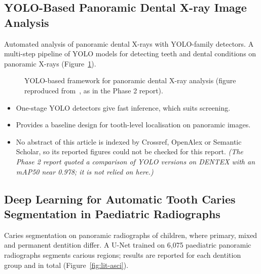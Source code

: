 \subsection{YOLO-Based Panoramic Dental X-ray Image Analysis~\cite{nassiri2025yolo}}
 Automated analysis of panoramic dental X-rays with YOLO-family detectors.
 A multi-step pipeline of YOLO models for detecting teeth and dental conditions
on panoramic X-rays (Figure~\ref{fig:lit-nassiri}).

\begin{figure}[!htbp]
\centering
{}
\caption[YOLO-based framework for panoramic dental X-ray analysis]{YOLO-based framework for panoramic
dental X-ray analysis (figure reproduced from~\cite{nassiri2025yolo}, as in the Phase 2 report).}
\label{fig:lit-nassiri}
\end{figure}

\begin{itemize}
\item One-stage YOLO detectors give fast inference, which suits screening.
\item Provides a baseline design for tooth-level localisation on panoramic images.
\end{itemize}
\begin{itemize}
\item No abstract of this article is indexed by Crossref, OpenAlex or Semantic Scholar, so its
  reported figures could not be checked for this report. \emph{(The Phase 2 report quoted a
  comparison of YOLO versions on DENTEX with an mAP50 near 0.978; it is not relied on here.)}
\end{itemize}

\subsection{Deep Learning for Automatic Tooth Caries Segmentation in Paediatric Radiographs~\cite{asci2024deep}}
 Caries segmentation on panoramic radiographs of children, where primary,
mixed and permanent dentition differ.
 A U-Net trained on 6,075 paediatric panoramic radiographs segments carious
regions; results are reported for each dentition group and in total (Figure~\ref{fig:lit-asci}).

